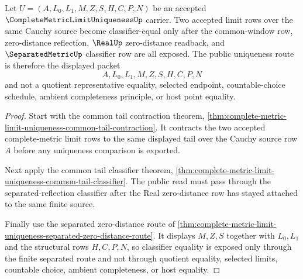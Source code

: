 \begin{theorem}\label{thm:complete-metric-limit-uniqueness-separated}
Let $U=(A,L_{0},L_{1},M,Z,S,H,C,P,N)$ be an accepted $\CompleteMetricLimitUniquenessUp$ carrier. Two accepted limit rows over the same Cauchy source become classifier-equal only after the common-window row, zero-distance reflection, $\RealUp$ zero-distance readback, and $\SeparatedMetricUp$ classifier row are all exposed. The public uniqueness route is therefore the displayed packet
$$
A,L_{0},L_{1},M,Z,S,H,C,P,N
$$
and not a quotient representative equality, selected endpoint, countable-choice schedule, ambient completeness principle, or host point equality.
\end{theorem}
\begin{proof}
Start with the common tail contraction theorem, \autoref{thm:complete-metric-limit-uniqueness-common-tail-contraction}. It contracts the two accepted complete-metric limit rows to the same displayed tail over the Cauchy source row $A$ before any uniqueness comparison is exported.

Next apply the common tail classifier theorem, \autoref{thm:complete-metric-limit-uniqueness-common-tail-classifier}. The public read must pass through the separated-reflection classifier after the Real zero-distance row has stayed attached to the same finite source.

Finally use the separated zero-distance route of \autoref{thm:complete-metric-limit-uniqueness-separated-zero-distance-route}. It displays $M,Z,S$ together with $L_{0},L_{1}$ and the structural rows $H,C,P,N$, so classifier equality is exposed only through the finite separated route and not through quotient equality, selected limits, countable choice, ambient completeness, or host equality.
\end{proof}

